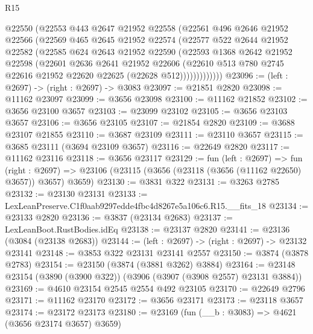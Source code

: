 \begin{lexlean}{R15}
\begin{coremodule}
            @22550
            (@22553
              @443
              @2647
              @21952
              @22558
              (@22561
                @496
                @2646
                @21952
                @22566
                (@22569
                  @465
                  @2645
                  @21952
                  @22574
                  (@22577
                    @522
                    @2644
                    @21952
                    @22582
                    (@22585
                      @624
                      @2643
                      @21952
                      @22590
                      (@22593
                        @1368
                        @2642
                        @21952
                        @22598
                        (@22601
                          @2636
                          @2641
                          @21952
                          @22606
                          (@22610
                            @513
                            @780
                            @2745
                            @22616
                            @21952
                            @22620
                            @22625
                            (@22628 @512)))))))))))))
@23096 := (left : @2697) -> (right : @2697) -> @3083
@23097 := @21851 @2820
@23098 := @11162 @23097
@23099 := @3656 @23098
@23100 := @11162 @21852
@23102 := @3656 @23100 @3657
@23103 := @23099 @23102
@23105 := @3656 @23103 @3657
@23106 := @3656 @23105
@23107 := @21854 @2820
@23109 := @3688 @23107 @21855
@23110 := @3687 @23109
@23111 := @23110 @3657
@23115 := @3685 @23111 (@3694 @23109 @3657)
@23116 := @22649 @2820
@23117 := @11162 @23116
@23118 := @3656 @23117
@23129 := fun (left : @2697) =>
  fun (right : @2697) => @23106 (@23115 (@3656 (@23118 (@3656 (@11162 @22650) @3657)) @3657) @3659)
@23130 := @3831 @322
@23131 := @3263 @2785
@23132 := @23130 @23131
@23133 := LexLeanPreserve.C1f0aab9297edde4fbc4d8267e5a106c6.R15.__fits_18
@23134 := @23133 @2820
@23136 := @3837 (@23134 @2683)
@23137 := LexLeanBoot.RustBodies.idEq
@23138 := @23137 @2820
@23141 := @23136 (@3084 (@23138 @2683))
@23144 := (left : @2697) -> (right : @2697) -> @23132 @23141
@23148 := @3853 @322 @23131 @23141 @2557
@23150 := @3874 (@3878 @2783)
@23154 := @23150 (@3874 (@3881 @3262) @3884)
@23164 := @23148 @23154 (@3890 (@3900 @322)) (@3906 (@3907 (@3908 @2557) @23131 @3884))
@23169 := @4610 @23154 @2545 @2554 @492 @23105
@23170 := @22649 @2796
@23171 := @11162 @23170
@23172 := @3656 @23171
@23173 := @23118 @3657
@23174 := @23172 @23173
@23180 := @23169 (fun (__b : @3083) => @4621 (@3656 @23174 @3657) @3659)

\end{coremodule}
\end{lexlean}
